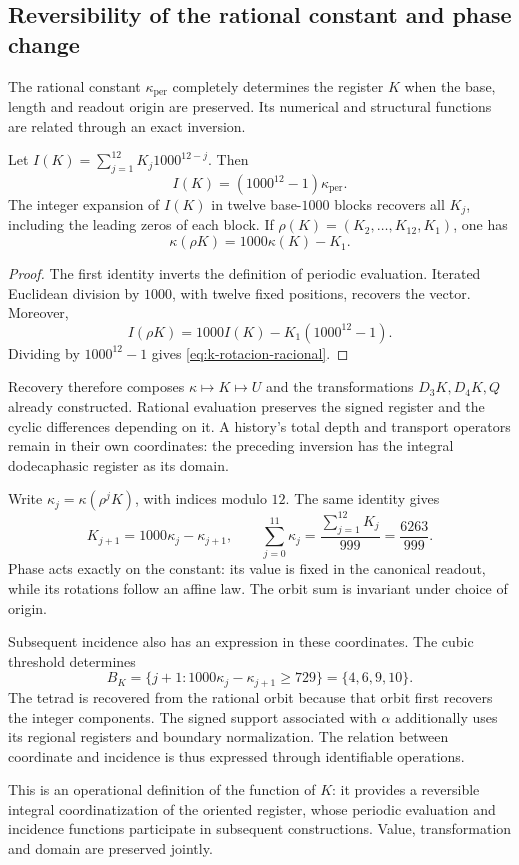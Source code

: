 \subsection{Reversibility of the rational constant and phase change}

The rational constant \(\kappa_{\mathrm{per}}\) completely determines
the register \(K\) when the base, length and readout origin
are preserved. Its numerical and structural functions are related
through an exact inversion.

\begin{proposition}
Let \(I(K)=\sum_{j=1}^{12}K_j1000^{12-j}\). Then
\[
 I(K)=(1000^{12}-1)\kappa_{\mathrm{per}}.
\]
The integer expansion of \(I(K)\) in twelve base-\(1000\) blocks
recovers all \(K_j\), including the leading zeros of each block.
If \(\rho(K)=(K_2,\ldots,K_{12},K_1)\), one has
\begin{equation}
 \kappa(\rho K)=1000\kappa(K)-K_1.
 \label{eq:k-rotacion-racional}
\end{equation}
\end{proposition}
\begin{proof}
The first identity inverts the definition of periodic evaluation.
Iterated Euclidean division by \(1000\), with twelve fixed positions,
recovers the vector. Moreover,
\[
 I(\rho K)=1000I(K)-K_1(1000^{12}-1).
\]
Dividing by \(1000^{12}-1\) gives \eqref{eq:k-rotacion-racional}.
\end{proof}

Recovery therefore composes \(\kappa\mapsto K\mapsto U\)
and the transformations \(D_3K,D_4K,Q\) already constructed. Rational
evaluation preserves the signed register and the cyclic differences
depending on it. A history's total depth and transport operators
remain in their own coordinates: the preceding inversion
has the integral dodecaphasic register as its domain.

Write \(\kappa_j=\kappa(\rho^jK)\), with indices modulo \(12\).
The same identity gives
\[
 K_{j+1}=1000\kappa_j-\kappa_{j+1},\qquad
 \sum_{j=0}^{11}\kappa_j=\frac{\sum_{j=1}^{12}K_j}{999}
 =\frac{6263}{999}.
\]
Phase acts exactly on the constant: its value is fixed
in the canonical readout, while its rotations follow an affine law.
The orbit sum is invariant under choice of origin.

Subsequent incidence also has an expression in these
coordinates. The cubic threshold determines
\[
 B_K=\{j+1:1000\kappa_j-\kappa_{j+1}\ge729\}
 =\{4,6,9,10\}.
\]
The tetrad is recovered from the rational orbit because that orbit
first recovers the integer components. The signed support associated
with \(\alpha\) additionally uses its regional registers and boundary
normalization. The relation between coordinate and incidence is thus
expressed through identifiable operations.

This is an operational definition of the function of \(K\): it provides
a reversible integral coordinatization of the oriented register, whose
periodic evaluation and incidence functions participate in
subsequent constructions. Value, transformation and domain
are preserved jointly.
